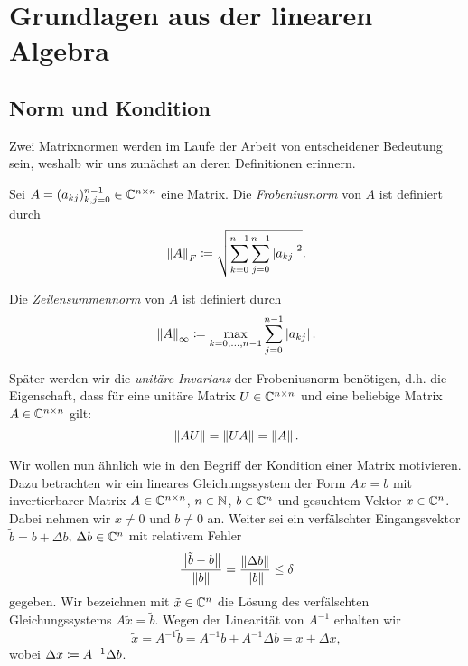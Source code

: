 \chapter{Grundlagen aus der linearen Algebra}
\section{Norm und Kondition}
Zwei Matrixnormen werden im Laufe der Arbeit von entscheidener Bedeutung sein,
weshalb wir uns zunächst an deren Definitionen erinnern.

\begin{mydef}
    Sei $A = (a_{kj})_{k,j=0}^{n-1} \in \mathbb{C}^{n\times n}$ eine Matrix.
    Die \emph{Frobeniusnorm} von $A$ ist definiert durch
    \begin{equation}
        \label{eq:frobenius_norm}
        \left\lVert A \right\rVert_F
        \coloneqq \sqrt{ \sum_{k=0}^{n-1} \sum_{j=0}^{n-1} \left\lvert a_{kj} \right\rvert^2}.
    \end{equation}

    \noindent Die \emph{Zeilensummennorm} von $A$ ist definiert durch
    \begin{equation}
        \label{eq:infinity_norm}
        \left\lVert A \right\rVert_\infty
        \coloneqq \max_{k=0, \dots, n-1} \sum_{j=0}^{n-1} \left\lvert a_{kj} \right\rvert.
    \end{equation}
\end{mydef}

\begin{remark}
    Später werden wir die \emph{unitäre Invarianz} der
    Frobeniusnorm benötigen, d.h. die Eigenschaft, dass für eine unitäre Matrix
    $U \in \mathbb{C}^{n\times n}$ und eine beliebige Matrix $A \in \mathbb{C}^{n\times n}$
    gilt:
    \[
        \left\lVert A U \right\rVert = \left\lVert U A \right\rVert = \left\lVert A \right\rVert.
    \]
\end{remark}

Wir wollen nun ähnlich wie in \cite[S. 205ff]{stoer1} den Begriff der Kondition
einer Matrix motivieren.  Dazu betrachten wir ein lineares Gleichungssystem der
Form
$Ax = b$ mit invertierbarer Matrix
$A \in \mathbb{C}^{n \times n}$, $n \in \mathbb{N}$, $b \in \mathbb{C}^n$
und gesuchtem Vektor $x \in \mathbb{C}^n$.
Dabei nehmen wir $x \neq 0$ und $b \neq 0$ an.
Weiter sei ein verfälschter Eingangsvektor $\tilde{b} = b + \Delta b$,
$\Delta b \in \mathbb{C}^n$ mit relativem Fehler
\[
    \frac{\left\lVert \tilde{b} - b \right\rVert}{\left\lVert b \right\rVert} = \frac{\left\lVert \Delta b \right\rVert}{\left\lVert b \right\rVert} \leq \delta
\]
gegeben.
Wir bezeichnen mit $\tilde{x} \in \mathbb{C}^n$ die Lösung des verfälschten Gleichungssystems
$A \tilde{x} = \tilde{b}$.
Wegen der Linearität von $A^{-1}$ erhalten wir
\[
    \tilde{x} = A^{-1} \tilde{b} = A^{-1} b + A^{-1} \Delta b = x + \Delta x,
\]
wobei $\Delta x \coloneqq A^{-1} \Delta b$.

